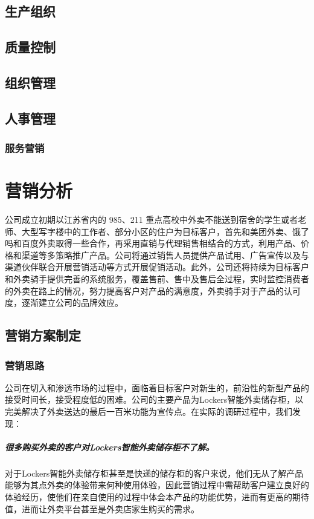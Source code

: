 \documentclass[violet]{main}
\begin{document}
		\section{生产组织}
		\section{质量控制}
		\section{组织管理}
		\section{人事管理}
			\subsection{服务营销}
	\chapter{营销分析}
		公司成立初期以江苏省内的 985、211 重点高校中外卖不能送到宿舍的学生或者老师、大型写字楼中的工作者、部分小区的住户为目标客户，首先和美团外卖、饿了吗和百度外卖取得一些合作，再采用直销与代理销售相结合的方式，利用产品、价格和渠道等多策略推广产品。公司将通过销售人员提供产品试用、广告宣传以及与渠道伙伴联合开展营销活动等方式开展促销活动。此外，公司还将持续为目标客户和外卖骑手提供完善的系统服务，覆盖售前、售中及售后全过程，实时监控消费者的外卖在路上的情况，努力提高客户对产品的满意度，外卖骑手对于产品的认可度，逐渐建立公司的品牌效应。
		\section{营销方案制定}
			\subsection{营销思路}
				公司在切入和渗透市场的过程中，面临着目标客户对新生的，前沿性的新型产品的接受时间长，接受程度低的困难。公司的主要产品为Lockers智能外卖储存柜，以完美解决了外卖送达的最后一百米功能为宣传点。在实际的调研过程中，我们发现： 
				\paragraph{很多购买外卖的客户对Lockers智能外卖储存柜不了解。}
					对于Lockers智能外卖储存柜甚至是快递的储存柜的客户来说，他们无从了解产品能够为其点外卖的体验带来何种使用体验，因此营销过程中需帮助客户建立良好的体验经历，使他们在亲自使用的过程中体会本产品的功能优势，进而有更高的期待值，进而让外卖平台甚至是外卖店家生购买的需求。 
\end{document}
